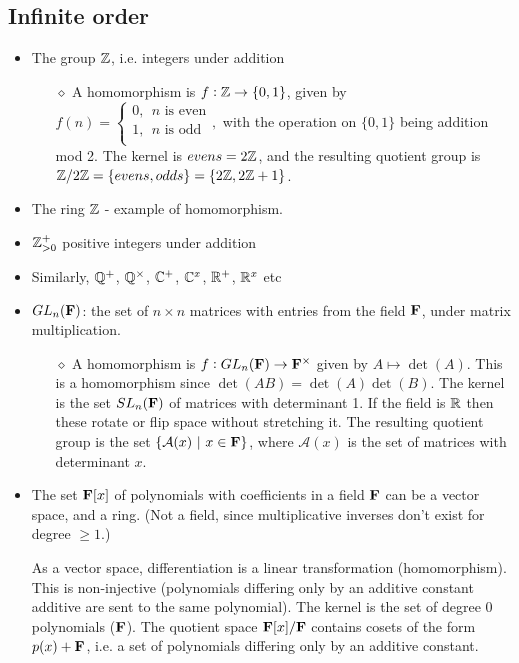 \subsection{Infinite order}

\begin{itemize}
\item The group $\mathbb{Z}$, i.e. integers under addition
  \begin{itemize}
  \item[$\diamond$] A homomorphism is $f:\mathbb{Z} \to \{0, 1\}$, given by $f(n) =
    \begin{cases}
      0, ~~\text{$n$ is even}\\
      1, ~~\text{$n$ is odd}\\
    \end{cases},$ with the operation on $\{0, 1\}$ being addition mod 2. The kernel is
    $evens = 2\mathbb{Z}$, and the resulting quotient group is
    $\mathbb{Z}/2\mathbb{Z} = \{evens, odds\} = \{2\mathbb{Z}, 2\mathbb{Z} + 1\}$.
  \end{itemize}

\item The ring $\mathbb{Z}$ - example of homomorphism.
\item $\mathbb{Z}_{>0}^+$ positive integers under addition

\item Similarly, $\mathbb{Q}^+$, $\mathbb{Q}^\times$, $\mathbb{C}^+$, $\mathbb{C}^x$, $\mathbb{R}^+$, $\mathbb{R}^x$ etc

\item $GL_n(\mathbf{F})$: the set of $n \times n$ matrices with entries from the field $\mathbf{F}$, under matrix
  multiplication.
  \begin{itemize}
  \item[$\diamond$] A homomorphism is $f:GL_n(\mathbf{F}) \to \mathbf{F}^\times$ given by $A \mapsto \det(A)$. This
    is a homomorphism since $\det(AB) = \det(A) \det(B)$. The kernel is the set $SL_n(\mathbf{F})$ of
    matrices with determinant 1. If the field is $\mathbb{R}$ then these rotate or flip space without
    stretching it. The resulting quotient group is the set $\{\mathcal{A}(x) ~|~ x \in \mathbf{F}\}$, where
    $\mathcal{A}(x)$ is the set of matrices with determinant $x$.
  \end{itemize}

\item The set $\mathbf{F}[x]$ of polynomials with coefficients in a field $\mathbf{F}$ can be a vector space, and a
  ring. (Not a field, since multiplicative inverses don't exist for degree $\geq 1$.)

  As a vector space, differentiation is a linear transformation (homomorphism). This is
  non-injective (polynomials differing only by an additive constant additive are sent to the same
  polynomial). The kernel is the set of degree 0 polynomials ($\mathbf{F}$). The quotient space $\mathbf{F}[x]/\mathbf{F}$
  contains cosets of the form $p(x) + \mathbf{F}$, i.e. a set of polynomials differing only by an additive
  constant.


\end{itemize}
